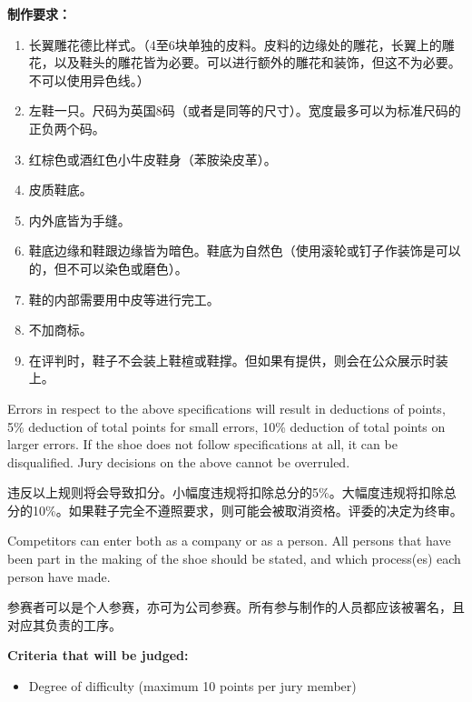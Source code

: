 \begin{paracol}{2}
        \switchcolumn
        \textbf{制作要求：}
        \begin{enumerate}
            \item 长翼雕花德比样式。（4至6块单独的皮料。皮料的边缘处的雕花，长翼上的雕花，以及鞋头的雕花皆为必要。可以进行额外的雕花和装饰，但这不为必要。不可以使用异色线。）
            \item 左鞋一只。尺码为英国8码（或者是同等的尺寸）。宽度最多可以为标准尺码的正负两个码。
            \item 红棕色或酒红色小牛皮鞋身（苯胺染皮革）。
            \item 皮质鞋底。
            \item 内外底皆为手缝。
            \item 鞋底边缘和鞋跟边缘皆为暗色。鞋底为自然色（使用滚轮或钉子作装饰是可以的，但不可以染色或磨色）。
            \item 鞋的内部需要用中皮等进行完工。
            \item 不加商标。
            \item 在评判时，鞋子不会装上鞋楦或鞋撑。但如果有提供，则会在公众展示时装上。
        \end{enumerate}
        \switchcolumn*

        Errors in respect to the above specifications will result in deductions of points, 5\% deduction of total points for small errors, 10\% deduction of total points on larger errors. If the shoe does not follow specifications at all, it can be disqualified. Jury decisions on the above cannot be overruled.

        \switchcolumn
        违反以上规则将会导致扣分。小幅度违规将扣除总分的5\%。大幅度违规将扣除总分的10\%。如果鞋子完全不遵照要求，则可能会被取消资格。评委的决定为终审。
        \switchcolumn*

        Competitors can enter both as a company or as a person. All persons that have been part in the making of the shoe should be stated, and which process(es) each person have made.

        \vspace{1em}

        \switchcolumn
        参赛者可以是个人参赛，亦可为公司参赛。所有参与制作的人员都应该被署名，且对应其负责的工序。
        \switchcolumn*

        \textbf{Criteria that will be judged:}
        \begin{itemize}
            \item Degree of difficulty (maximum 10 points per jury member)


\end{itemize}
\end{paracol}
